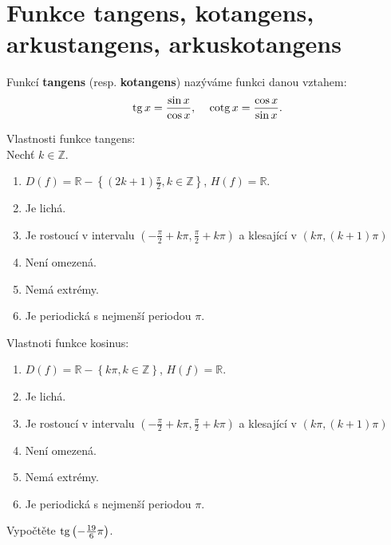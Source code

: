 \section{Funkce tangens, kotangens, arkustangens, arkuskotangens}
\begin{definition}
  Funkcí \textbf{tangens} (resp. \textbf{kotangens}) nazýváme funkci danou vztahem:
  \begin{align*}
    \tg x = \frac{\sin x}{\cos x}, & & \cotg x = \frac{\cos x}{\sin x}.
  \end{align*}
\end{definition}

\begin{veta}
    Vlastnosti funkce tangens:\\
    Nechť $k\in \mathbb Z.$
    \begin{enumerate}[$i.$]
        \item $D(f)= \mathbb R-\left \{ (2k+1)\frac{\pi}{2}, k\in \mathbb Z \right \} $, $H(f)= \mathbb R $.
       	\item Je lichá.
        \item Je rostoucí v intervalu $\left ( -\frac{\pi}{2}+k\pi, \frac{\pi}{2}+k\pi \right ) $
        a klesající v $\left ( k\pi, (k+1)\pi \right ) $
        \item Není omezená.
        \item Nemá extrémy.
        \item Je periodická s nejmenší periodou $\pi.$
    \end{enumerate}
    Vlastnoti funkce kosinus:
    \begin{enumerate}[$i.$]
        \item $D(f)= \mathbb R-\left \{ k\pi, k\in \mathbb Z \right \} $, $H(f)= \mathbb R $.
       	\item Je lichá.
        \item Je rostoucí v intervalu $\left ( -\frac{\pi}{2}+k\pi, \frac{\pi}{2}+k\pi \right ) $
        a klesající v $\left ( k\pi, (k+1)\pi \right ) $
        \item Není omezená.
        \item Nemá extrémy.
        \item Je periodická s nejmenší periodou $\pi.$
    \end{enumerate}
\end{veta}

\begin{priklad}
Vypočtěte $\operatorname{tg} \left ( -\frac{19}{6}\pi \right ) $.
\end{priklad}

